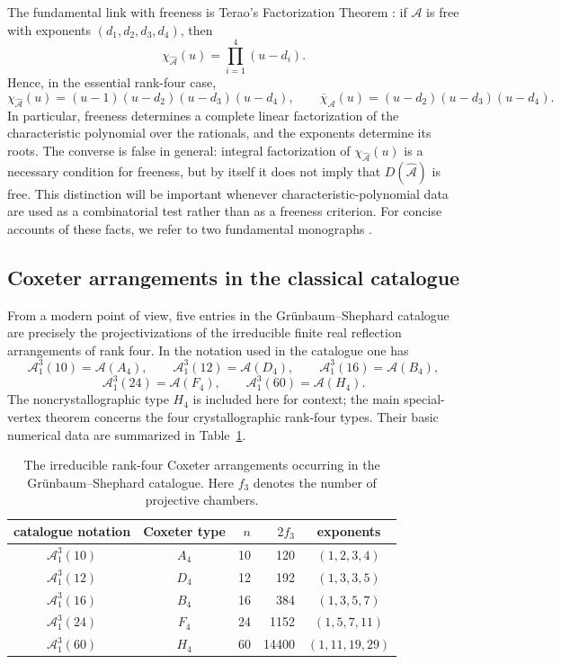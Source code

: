 \documentclass[11pt]{article}
\theoremstyle{definition}
\theoremstyle{remark}
\newcommand{\cA}{\mathcal A}
\begin{document}
The fundamental link with freeness is Terao's Factorization Theorem \cite{terao}:
if $\cA$ is free with exponents $(d_1,d_2,d_3,d_4)$, then
\[
 \chi_{\widehat{\cA}}(u)
 =
 \prod_{i=1}^{4}(u-d_i).
\]
Hence, in the essential rank-four case,
\[
 \chi_{\widehat{\cA}}(u)
 =(u-1)(u-d_2)(u-d_3)(u-d_4),
 \qquad
 \overline\chi_{\cA}(u)
 =(u-d_2)(u-d_3)(u-d_4).
\]
In particular, freeness determines a complete linear factorization of the
characteristic polynomial over the rationals, and the exponents determine
its roots.  The converse is false in general: integral factorization of
$\chi_{\widehat{\cA}}(u)$ is a necessary condition for freeness, but by
itself it does not imply that $D(\widehat{\cA})$ is free.  This distinction
will be important whenever characteristic-polynomial data are used as a
combinatorial test rather than as a freeness criterion. For concise accounts of these facts, we refer to two fundamental monographs \cite{DimcaBook,OrlikTerao}.
\subsection{Coxeter arrangements in the classical catalogue}
\label{subsec:coxeter-catalogue}

From a modern point of view, five entries in the Gr\"unbaum--Shephard catalogue are precisely the
projectivizations of the irreducible finite real reflection arrangements of
rank four.  In the notation used in the catalogue one has
\[
\cA^3_1(10)=\cA(A_4),\qquad
\cA^3_1(12)=\cA(D_4),\qquad
\cA^3_1(16)=\cA(B_4),
\]
\[
\cA^3_1(24)=\cA(F_4),\qquad
\cA^3_1(60)=\cA(H_4).
\]
The noncrystallographic type $H_4$ is included here for context; the main
special-vertex theorem concerns the four crystallographic rank-four types.
Their basic numerical data are summarized in
Table~\ref{tab:coxeter-catalogue}.
\begin{table}[htbp]
\centering
\renewcommand{\arraystretch}{1.15}
\begin{tabular}{c|c|r|r|c}
\toprule
catalogue notation & Coxeter type & $n$  & $2f_3$ & exponents\\
\midrule
$\cA^3_1(10)$ & $A_4$ & 10 &  120 & $(1,2,3,4)$\\
$\cA^3_1(12)$ & $D_4$ & 12 & 192 & $(1,3,3,5)$\\
$\cA^3_1(16)$ & $B_4$ & 16 &  384 & $(1,3,5,7)$\\
$\cA^3_1(24)$ & $F_4$ & 24 &  1152 & $(1,5,7,11)$\\
$\cA^3_1(60)$ & $H_4$ & 60 & 14400 & $(1,11,19,29)$\\
\bottomrule
\end{tabular}
\caption{The irreducible rank-four Coxeter arrangements occurring in the
Gr\"unbaum--Shephard catalogue. Here $f_3$ denotes the number of projective
chambers.}
\label{tab:coxeter-catalogue}
\end{table}
\end{document}
